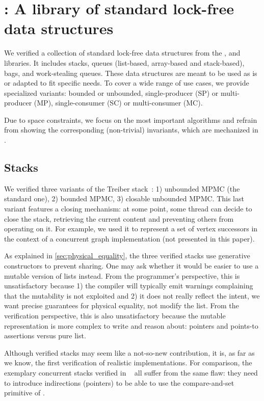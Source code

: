 \section{\Saturn: A library of standard lock-free data structures}
\label{sec:saturn}

We verified a collection of standard lock-free data structures from the \Saturn, \Eio and \Picos~\citep*{picos} libraries.
It includes stacks, queues (list-based, array-based and stack-based), bags, and work-stealing queues.
These data structures are meant to be used as is or adapted to fit specific needs.
To cover a wide range of use cases, we provide specialized variants: bounded or unbounded, single-producer (SP) or multi-producer (MP), single-consumer (SC) or multi-consumer (MC).

Due to space constraints, we focus on the most important algorithms and refrain from showing the corresponding (non-trivial) \Iris invariants, which are mechanized in \Rocq.

\subsection{Stacks}

We verified three variants of the Treiber stack~\citep*{thomas1986systems}: 1) unbounded MPMC (the standard one), 2) bounded MPMC, 3) closable unbounded MPMC.
This last variant features a closing mechanism: at some point, some thread can decide to close the stack, retrieving the current content and preventing others from operating on it.
For example, we used it to represent a set of vertex successors in the context of a concurrent graph implementation (not presented in this paper).

As explained in \cref{sec:physical_equality}, the three verified stacks use generative constructors to prevent sharing.
One may ask whether it would be easier to use a mutable version of lists instead.
From the programmer's perspective, this is unsatisfactory because 1) the compiler will typically emit warnings complaining that the mutability is not exploited and 2) it does not really reflect the intent, \ie we want precise guarantees for physical equality, not modify the list.
From the verification perspective, this is also unsatisfactory because the mutable representation is more complex to write and reason about: pointers and points-to assertions versus pure \Rocq list.

Although verified stacks may seem like a not-so-new contribution, it is, as far as we know, the first verification of realistic \OCaml implementations.
For comparison, the exemplary concurrent stacks verified in \Iris~\citep*{iris-examples} all suffer from the same flaw: they need to introduce indirections (pointers) to be able to use the compare-and-set primitive of \HeapLang.

